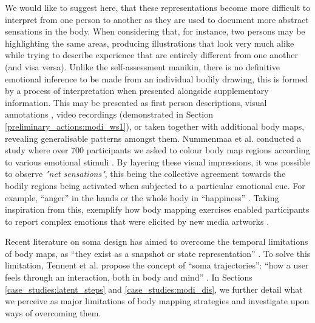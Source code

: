 We would like to suggest here, that these representations become more difficult to interpret from one person to another as they are used to document more abstract sensations in the body. When considering that, for instance, two persons may be highlighting the same areas, producing illustrations that look very much alike while trying to describe experience that are entirely different from one another (and visa versa). Unlike the self-assessment manikin, there is no definitive emotional inference to be made from an individual bodily drawing, this is formed by a process of interpretation when presented alongside supplementary information. This may be presented as first person descriptions, visual annotations \cite{windlin_soma_2019}, video recordings (demonstrated in Section \ref{preliminary_actions:modi_ws1}), or taken together with additional body maps, revealing generalisable patterns amongst them. %
Nummenmaa et al. conducted a study where over 700 participants we asked to colour body map regions according to various emotional stimuli \cite{nummenmaa_bodily_2014}. By layering these visual impressions, it was possible to observe \textit{"net sensations"}, this being the collective agreement towards the bodily regions being activated when subjected to a particular emotional cue. For example, “anger” in the hands or the whole body in “happiness” \cite{davey_where_2021}. Taking inspiration from this, \citeauthor{schino_applying_2021} exemplify how body mapping exercises enabled participants to report complex emotions that were elicited by new media artworks \cite{schino_applying_2021}.

 Recent literature on soma design has aimed to overcome the temporal limitations of body maps, as “they exist as a snapshot or state representation” \cite{tennent_articulating_2021}. To solve this limitation, Tennent et al. propose the concept of “soma trajectories”: “how a user feels through an interaction, both in body and mind” \cite{tennent_articulating_2021}. In Sections \ref{case_studies:latent_steps} and \ref{case_studies:modi_dis}, we further detail what we perceive as major limitations of body mapping strategies and investigate upon ways of overcoming them.

